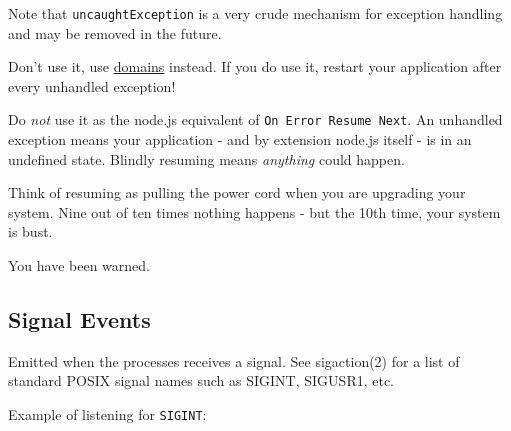 \begin{Shaded}
\begin{Highlighting}[]
\NormalTok{(}\NormalTok{, }
  \NormalTok{(} 
\NormalTok{\});}

\NormalTok{() \{}
  \NormalTok{(}\NormalTok{);}
\NormalTok{\}, }\NormalTok{);}

\NormalTok{(}\NormalTok{);}
\end{Highlighting}
\end{Shaded}

Note that \texttt{uncaughtException} is a very crude mechanism for
exception handling and may be removed in the future.

Don't use it, use \href{domain.html}{domains} instead. If you do use it,
restart your application after every unhandled exception!

Do \emph{not} use it as the node.js equivalent of
\texttt{On Error Resume Next}. An unhandled exception means your
application - and by extension node.js itself - is in an undefined
state. Blindly resuming means \emph{anything} could happen.

Think of resuming as pulling the power cord when you are upgrading your
system. Nine out of ten times nothing happens - but the 10th time, your
system is bust.

You have been warned.

\subsection{Signal Events}

Emitted when the processes receives a signal. See sigaction(2) for a
list of standard POSIX signal names such as SIGINT, SIGUSR1, etc.

Example of listening for \texttt{SIGINT}:

\begin{Shaded}
\begin{Highlighting}[]
\NormalTok{();}

\NormalTok{(}\NormalTok{, }\NormalTok{() \{}
  \NormalTok{(}\NormalTok{);}
\NormalTok{\});}
\end{Highlighting}
\end{Shaded}

